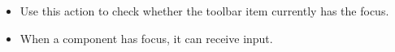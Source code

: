 
\begin{itemize}
\item Use this action to check whether the toolbar item currently has the focus. 
\item When a component has focus, it can receive input. 
\end{itemize}
